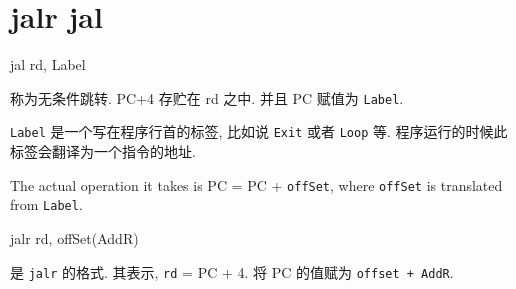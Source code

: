 \documentclass[11pt]{article}
\begin{document}
\section{jalr jal}
\label{sec:org8d85882}
\centerline{jal rd, Label}
称为无条件跳转. PC+4 存贮在 rd 之中. 并且 PC 赋值为 \texttt{Label}. 

\texttt{Label} 是一个写在程序行首的标签, 比如说 \texttt{Exit} 或者 \texttt{Loop} 等. 程序运行的时候此标签会翻译为一个指令的地址. 

The actual operation it takes is PC = PC + \texttt{offSet}, where \texttt{offSet} is translated from \texttt{Label}. 

\centerline{jalr rd, offSet(AddR)}
是 \texttt{jalr} 的格式. 其表示, \texttt{rd} = PC + 4. 将 PC 的值赋为 \texttt{offset + AddR}. 
\end{document}
